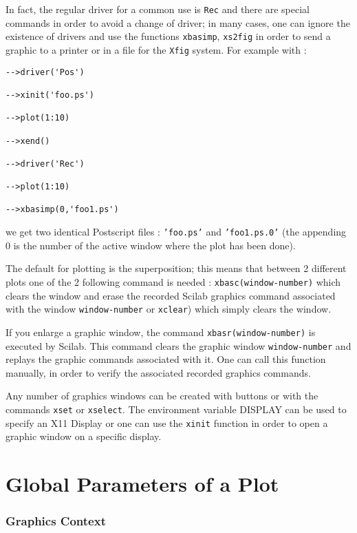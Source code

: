 In fact, the regular driver for a common use is {\tt Rec} and there
are special commands in order to avoid a change of driver; in many
cases, one can ignore the existence of drivers and use the
functions \verb+xbasimp+, \verb+xs2fig+ in order to send a graphic 
to a printer or in a file for the \verb+Xfig+ system. For example with
:

\begin{verbatim}
-->driver('Pos')
 
-->xinit('foo.ps')
 
-->plot(1:10)
 
-->xend()
 
-->driver('Rec')
 
-->plot(1:10)
 
-->xbasimp(0,'foo1.ps')

\end{verbatim}

\noindent we get two identical Postscript files : {\tt 'foo.ps'} and {\tt 'foo1.ps.0'}
(the appending 0 is the number of the active window where the plot has been 
done).

The default for plotting is the superposition; this means that between
2 different plots one of the 2 following command is needed :
{\tt xbasc(window-number)} which clears the window and erase the
recorded Scilab graphics command associated with the window 
\verb+window-number+ or {\tt xclear}) which simply clears the window.

If you enlarge a graphic window, the command \verb+xbasr(window-number)+
is executed by Scilab. This command clears the graphic window
\verb+window-number+ and replays the graphic commands associated with it. One 
can call this function manually, in order to verify the associated
recorded graphics commands. 

Any number of graphics windows can be created with buttons 
or with the commands \verb+xset+ or \verb+xselect+. The environment 
variable DISPLAY can be used to specify an X11 Display or one can use
the \verb+xinit+ function in order to open a graphic window on a
specific display. 

\section{Global Parameters of a Plot}
\subsubsection{Graphics Context}

